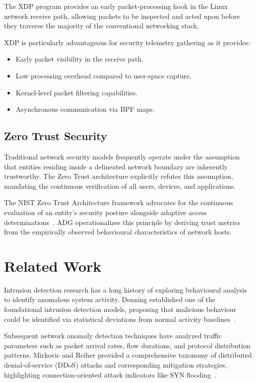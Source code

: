 \documentclass[conference]{IEEEtran}
\begin{document}
The XDP program provides an early packet-processing hook in the Linux network receive path, allowing packets to be inspected and acted upon before they traverse the majority of the conventional networking stack.

XDP is particularly advantageous for security telemetry gathering as it provides:
\begin{itemize}
\item Early packet visibility in the receive path.
\item Low processing overhead compared to user-space capture.
\item Kernel-level packet filtering capabilities.
\item Asynchronous communication via BPF maps.
\end{itemize}

\subsection{Zero Trust Security}
Traditional network security models frequently operate under the assumption that entities residing inside a delineated network boundary are inherently trustworthy. The Zero Trust architecture explicitly refutes this assumption, mandating the continuous verification of all users, devices, and applications.

The NIST Zero Trust Architecture framework advocates for the continuous evaluation of an entity's security posture alongside adaptive access determinations~\cite{nist800207}. ADG operationalizes this principle by deriving trust metrics from the empirically observed behavioural characteristics of network hosts.


\section{Related Work}

Intrusion detection research has a long history of exploring behavioural analysis to identify anomalous system activity. Denning established one of the foundational intrusion detection models, proposing that malicious behaviour could be identified via statistical deviations from normal activity baselines~\cite{denning1987ids}.

Subsequent network anomaly detection techniques have analyzed traffic parameters such as packet arrival rates, flow durations, and protocol distribution patterns. Mirkovic and Reiher provided a comprehensive taxonomy of distributed denial-of-service (DDoS) attacks and corresponding mitigation strategies, highlighting connection-oriented attack indicators like SYN flooding~\cite{mirkovic2004survey}.
\end{document}
